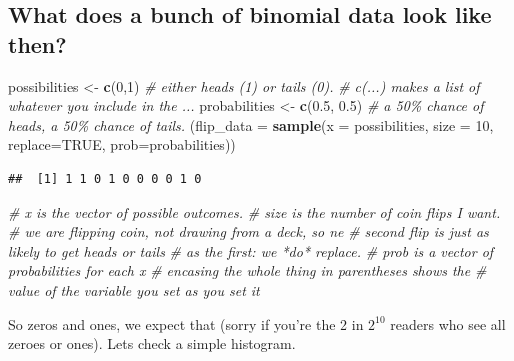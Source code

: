 \documentclass[
]{book}
\newenvironment{Shaded}{\begin{snugshade}}{\end{snugshade}}
\newcommand{\CommentTok}[1]{\textcolor[rgb]{0.56,0.35,0.01}{\textit{#1}}}
\newcommand{\DataTypeTok}[1]{\textcolor[rgb]{0.13,0.29,0.53}{#1}}
\newcommand{\DecValTok}[1]{\textcolor[rgb]{0.00,0.00,0.81}{#1}}
\newcommand{\FloatTok}[1]{\textcolor[rgb]{0.00,0.00,0.81}{#1}}
\newcommand{\KeywordTok}[1]{\textcolor[rgb]{0.13,0.29,0.53}{\textbf{#1}}}
\newcommand{\NormalTok}[1]{#1}
\newcommand{\OtherTok}[1]{\textcolor[rgb]{0.56,0.35,0.01}{#1}}
\newcommand{\StringTok}[1]{\textcolor[rgb]{0.31,0.60,0.02}{#1}}
\begin{document}
\hypertarget{what-does-a-bunch-of-binomial-data-look-like-then}{%
\subsection{What does a bunch of binomial data look like then?}\label{what-does-a-bunch-of-binomial-data-look-like-then}}

\begin{Shaded}
\begin{Highlighting}[]
\NormalTok{possibilities \textless{}{-}}\StringTok{ }\KeywordTok{c}\NormalTok{(}\DecValTok{0}\NormalTok{,}\DecValTok{1}\NormalTok{) }\CommentTok{\# either heads (1) or tails (0).}
                        \CommentTok{\# c(...) makes a list of whatever you include in the ...}
\NormalTok{probabilities \textless{}{-}}\StringTok{ }\KeywordTok{c}\NormalTok{(}\FloatTok{0.5}\NormalTok{, }\FloatTok{0.5}\NormalTok{)}
                        \CommentTok{\# a 50\% chance of heads, a 50\% chance of tails.}
\NormalTok{(}\DataTypeTok{flip\_data =} \KeywordTok{sample}\NormalTok{(}\DataTypeTok{x =}\NormalTok{ possibilities, }\DataTypeTok{size =} \DecValTok{10}\NormalTok{, }\DataTypeTok{replace=}\OtherTok{TRUE}\NormalTok{, }\DataTypeTok{prob=}\NormalTok{probabilities))}
\end{Highlighting}
\end{Shaded}

\begin{verbatim}
##  [1] 1 1 0 1 0 0 0 0 1 0
\end{verbatim}

\begin{Shaded}
\begin{Highlighting}[]
                        \CommentTok{\# x is the vector of possible outcomes.}
                        \CommentTok{\# size is the number of coin flips I want.}
                        \CommentTok{\# we are flipping coin, not drawing from a deck, so ne}
                        \CommentTok{\#   second flip is just as likely to get heads or tails}
                        \CommentTok{\#   as the first: we *do* replace.}
                        \CommentTok{\# prob is a vector of probabilities for each x}
                        \CommentTok{\# encasing the whole thing in parentheses shows the}
                        \CommentTok{\#   value of the variable you set as you set it}
\end{Highlighting}
\end{Shaded}

So zeros and ones, we expect that (sorry if you're the 2 in \(2^{10}\) readers who see all zeroes or ones). Lets check a simple histogram.
\end{document}

